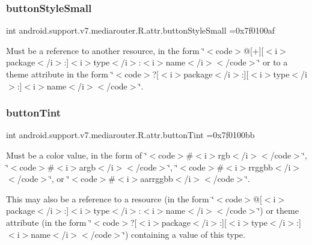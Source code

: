 \subsubsection{\texorpdfstring{button\+Style\+Small}{buttonStyleSmall}}
{\footnotesize\ttfamily int android.\+support.\+v7.\+mediarouter.\+R.\+attr.\+button\+Style\+Small =0x7f0100af\hspace{0.3cm}{\ttfamily [static]}}

Must be a reference to another resource, in the form \char`\"{}$<$code$>$@\mbox{[}+\mbox{]}\mbox{[}$<$i$>$package$<$/i$>$\+:\mbox{]}$<$i$>$type$<$/i$>$\+:$<$i$>$name$<$/i$>$$<$/code$>$\char`\"{} or to a theme attribute in the form \char`\"{}$<$code$>$?\mbox{[}$<$i$>$package$<$/i$>$\+:\mbox{]}\mbox{[}$<$i$>$type$<$/i$>$\+:\mbox{]}$<$i$>$name$<$/i$>$$<$/code$>$\char`\"{}. \mbox{\label{classandroid_1_1support_1_1v7_1_1mediarouter_1_1R_1_1attr_a7a0864e38dac2a7dab7d5eb405509714}} 
\subsubsection{\texorpdfstring{button\+Tint}{buttonTint}}
{\footnotesize\ttfamily int android.\+support.\+v7.\+mediarouter.\+R.\+attr.\+button\+Tint =0x7f0100bb\hspace{0.3cm}{\ttfamily [static]}}

Must be a color value, in the form of \char`\"{}$<$code$>$\#$<$i$>$rgb$<$/i$>$$<$/code$>$\char`\"{}, \char`\"{}$<$code$>$\#$<$i$>$argb$<$/i$>$$<$/code$>$\char`\"{}, \char`\"{}$<$code$>$\#$<$i$>$rrggbb$<$/i$>$$<$/code$>$\char`\"{}, or \char`\"{}$<$code$>$\#$<$i$>$aarrggbb$<$/i$>$$<$/code$>$\char`\"{}. 

This may also be a reference to a resource (in the form \char`\"{}$<$code$>$@\mbox{[}$<$i$>$package$<$/i$>$\+:\mbox{]}$<$i$>$type$<$/i$>$\+:$<$i$>$name$<$/i$>$$<$/code$>$\char`\"{}) or theme attribute (in the form \char`\"{}$<$code$>$?\mbox{[}$<$i$>$package$<$/i$>$\+:\mbox{]}\mbox{[}$<$i$>$type$<$/i$>$\+:\mbox{]}$<$i$>$name$<$/i$>$$<$/code$>$\char`\"{}) containing a value of this type. \mbox{\label{classandroid_1_1support_1_1v7_1_1mediarouter_1_1R_1_1attr_a329e426e78f4dea5ee1c3caca9bd8629}} 
